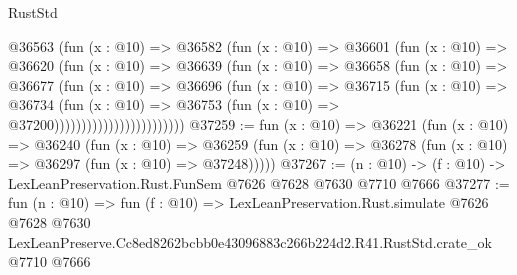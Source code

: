 \begin{lexlean}{RustStd}
\begin{coremodule}
                            @36563
                              (fun (x : @10) =>
                              @36582
                                (fun (x : @10) =>
                                @36601
                                  (fun (x : @10) =>
                                  @36620
                                    (fun (x : @10) =>
                                    @36639
                                      (fun (x : @10) =>
                                      @36658
                                        (fun (x : @10) =>
                                        @36677
                                          (fun (x : @10) =>
                                          @36696
                                            (fun (x : @10) =>
                                            @36715
                                              (fun (x : @10) =>
                                              @36734
                                                (fun (x : @10) =>
                                                @36753
                                                  (fun (x : @10) => @37200))))))))))))))))))))))))
@37259 := fun (x : @10) =>
  @36221
    (fun (x : @10) =>
    @36240
      (fun (x : @10) =>
      @36259 (fun (x : @10) => @36278 (fun (x : @10) => @36297 (fun (x : @10) => @37248)))))
@37267 := (n : @10) -> (f : @10) -> LexLeanPreservation.Rust.FunSem @7626 @7628 @7630 @7710 @7666
@37277 := fun (n : @10) =>
  fun (f : @10) =>
  LexLeanPreservation.Rust.simulate
    @7626
    @7628
    @7630
    LexLeanPreserve.Cc8ed8262bcbb0e43096883c266b224d2.R41.RustStd.crate_ok
    @7710
    @7666
\end{coremodule}
\end{lexlean}

